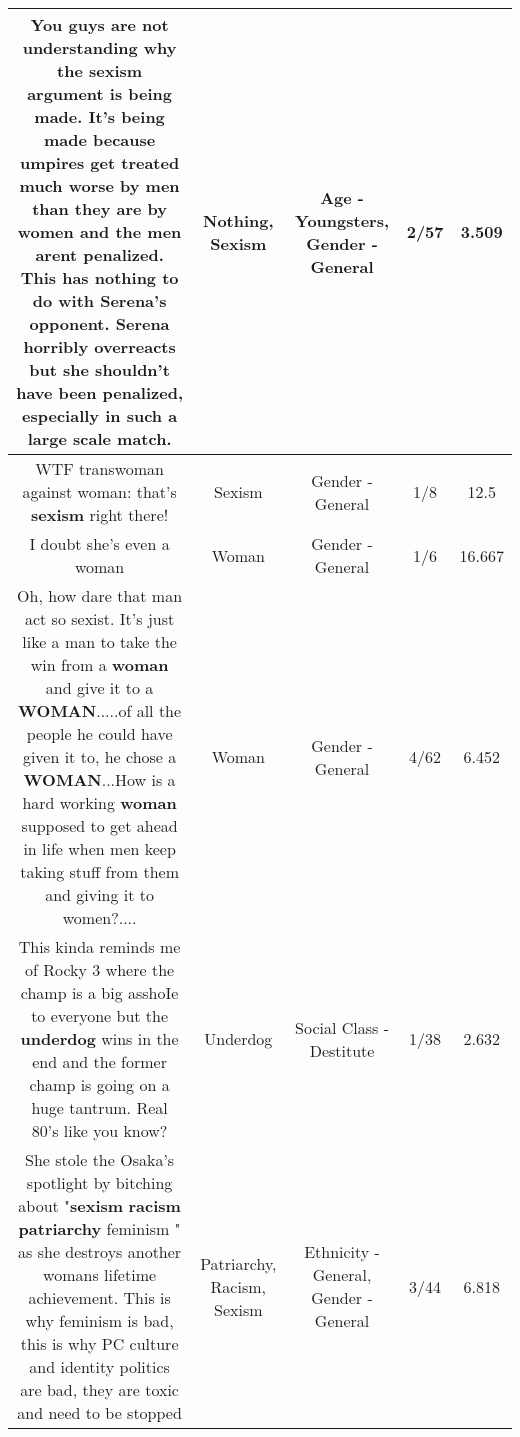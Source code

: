 \documentclass[11pt]{article}
\newlength\mylength
\begin{document}
\begin{center}
\begin{longtable}{|C{.65\mylength}|C{.30\mylength}|C{.12\mylength}|C{.12\mylength}|C{.12\mylength}|}
  \small You guys are not understanding why the \textbf{sexism} argument is being made. It's being made because umpires get treated much worse by men than they are by women and the men arent penalized. This has \textbf{nothing} to do with Serena's opponent. Serena horribly overreacts but she shouldn't have been penalized, especially in such a large scale match.\normalsize   & Nothing, Sexism & Age - Youngsters, Gender - General & 2/57 & 3.509 \\  \hline
  \small WTF transwoman against woman: that's \textbf{sexism} right there!\normalsize   & Sexism & Gender - General & 1/8 & 12.5 \\  \hline
  \small I doubt she's even a woman\normalsize   & Woman & Gender - General & 1/6 & 16.667 \\  \hline
  \small Oh, how dare that man act so sexist. It's just like a man to take the win from a \textbf{woman} and give it to a \textbf{WOMAN}.....of all the people he could have given it to, he chose a \textbf{WOMAN}...How is a hard working \textbf{woman} supposed to get ahead in life when men keep taking stuff from them and giving it to women?....\normalsize   & Woman & Gender - General & 4/62 & 6.452 \\  \hline
  \small This kinda reminds me of Rocky 3 where the champ is a big asshoIe to everyone but the \textbf{underdog} wins in the end and the former champ is going on a huge tantrum. Real 80's like you know?\normalsize   & Underdog & Social Class - Destitute & 1/38 & 2.632 \\  \hline
  \small She stole the Osaka's spotlight by bitching about "\textbf{sexism} \textbf{racism} \textbf{patriarchy} feminism " as she destroys another womans lifetime achievement. This is why feminism is bad, this is why PC culture and identity politics are bad, they are toxic and need to be stopped\normalsize   & Patriarchy, Racism, Sexism & Ethnicity - General, Gender - General & 3/44 & 6.818 \\  \hline

\end{longtable}
\end{center}
\end{document}
